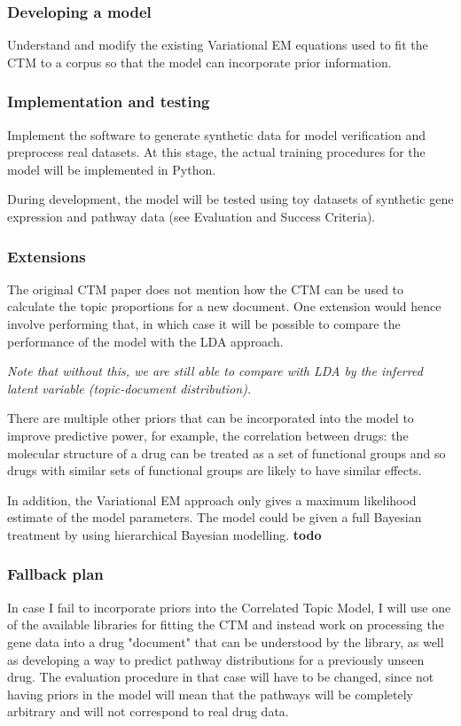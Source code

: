 \documentclass[12pt,a4]{article}
\begin{document}
\subsubsection*{Developing a model}

Understand and modify the existing Variational EM equations used to fit the CTM to a corpus so that the model can incorporate prior information.

\subsubsection*{Implementation and testing}

Implement the software to generate synthetic data for model verification and preprocess real datasets. At this stage, the actual training procedures for the model will be implemented in Python.

During development, the model will be tested using toy datasets of synthetic gene expression and pathway data (see Evaluation and Success Criteria).

\subsubsection*{Extensions}
The original CTM paper does not mention how the CTM can be used to calculate the topic proportions for a new document. One extension would hence involve performing that, in which case it will be possible to compare the performance of the model with the LDA approach.

\textit{Note that without this, we are still able to compare with LDA by the inferred latent variable (topic-document distribution).}

There are multiple other priors that can be incorporated into the model to improve predictive power, for example, the correlation between drugs: the molecular structure of a drug can be treated as a set of functional groups and so drugs with similar sets of functional groups are likely to have similar effects.

In addition, the Variational EM approach only gives a maximum likelihood estimate of the model parameters. The model could be given a full Bayesian treatment by using hierarchical Bayesian modelling. \textbf{todo}

\subsubsection*{Fallback plan}
In case I fail to incorporate priors into the Correlated Topic Model, I will use one of the available libraries for fitting the CTM and instead work on processing the gene data into a drug "document" that can be understood by the library, as well as developing a way to predict pathway distributions for a previously unseen drug. The evaluation procedure in that case will have to be changed, since not having priors in the model will mean that the pathways will be completely arbitrary and will not correspond to real drug data.
\end{document}
